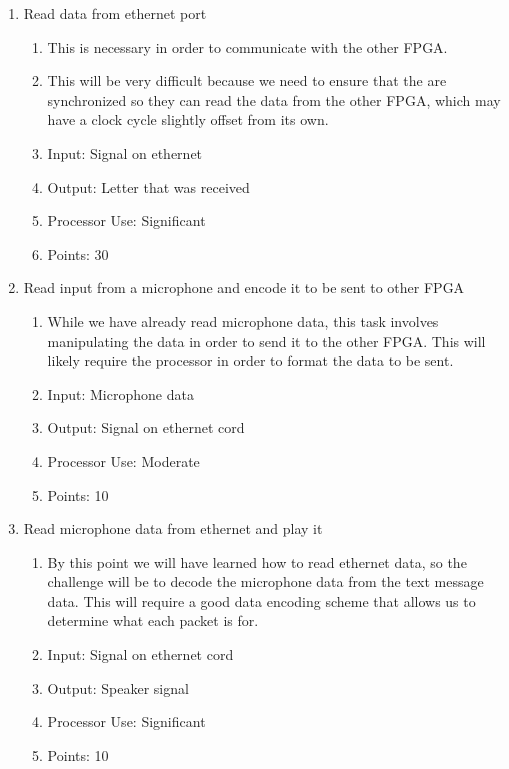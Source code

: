 \documentclass[letterpaper]{article}
\begin{document}
\begin{enumerate}
\item Read data from ethernet port
\begin{enumerate}
\item This is necessary in order to communicate with the other FPGA.
\item This will be very difficult because we need to ensure that the are synchronized so they can read the data from the other FPGA, which may have a clock cycle slightly offset from its own.
\item Input: Signal on ethernet
\item Output: Letter that was received
\item Processor Use: Significant
\item Points: 30
\end{enumerate}

\item Read input from a microphone and encode it to be sent to other FPGA
\begin{enumerate}
\item While we have already read microphone data, this task involves manipulating the data in order to send it to the other FPGA. This will likely require the processor in order to format the data to be sent.
\item Input: Microphone data
\item Output: Signal on ethernet cord
\item Processor Use: Moderate
\item Points: 10
\end{enumerate}

\item Read microphone data from ethernet and play it
\begin{enumerate}
\item By this point we will have learned how to read ethernet data, so the challenge will be to decode the microphone data from the text message data. This will require a good data encoding scheme that allows us to determine what each packet is for.
\item Input: Signal on ethernet cord
\item Output: Speaker signal
\item Processor Use: Significant
\item Points: 10
\end{enumerate}


\end{enumerate}
\end{document}
